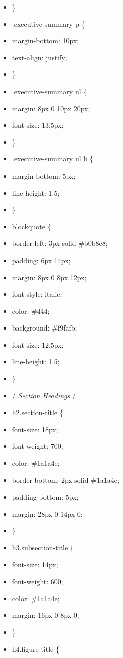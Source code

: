 \documentclass[11pt]{article}
\begin{document}
\begin{itemize}[leftmargin=*,itemsep=2pt,topsep=2pt]
\item {} \}
\item {} .executive-summary p \{
\item {} margin-bottom: 10px;
\item {} text-align: justify;
\item {} \}
\item {} .executive-summary ul \{
\item {} margin: 8px 0 10px 20px;
\item {} font-size: 13.5px;
\item {} \}
\item {} .executive-summary ul li \{
\item {} margin-bottom: 5px;
\item {} line-height: 1.5;
\item {} \}
\item {} blockquote \{
\item {} border-left: 3px solid \#b0b8c8;
\item {} padding: 6px 14px;
\item {} margin: 8px 0 8px 12px;
\item {} font-style: italic;
\item {} color: \#444;
\item {} background: \#f9fafb;
\item {} font-size: 12.5px;
\item {} line-height: 1.5;
\item {} \}
\item {} /\emph{ Section Headings }/
\item {} h2.section-title \{
\item {} font-size: 18px;
\item {} font-weight: 700;
\item {} color: \#1a1a4e;
\item {} border-bottom: 2px solid \#1a1a4e;
\item {} padding-bottom: 5px;
\item {} margin: 28px 0 14px 0;
\item {} \}
\item {} h3.subsection-title \{
\item {} font-size: 14px;
\item {} font-weight: 600;
\item {} color: \#1a1a4e;
\item {} margin: 16px 0 8px 0;
\item {} \}
\item {} h4.figure-title \{

\end{itemize}
\end{document}
